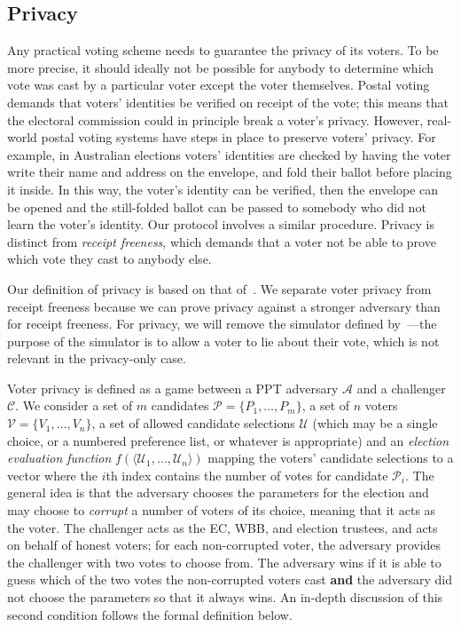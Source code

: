 \documentclass[12pt,a4paper]{article}
\theoremstyle{definition}
\begin{document}
\subsection{Privacy}
Any practical voting scheme needs to guarantee the privacy of its voters. To be more precise, it should ideally not be possible for anybody to determine which vote was cast by a particular voter except the voter themselves. Postal voting demands that voters' identities be verified on receipt of the vote; this means that the electoral commission could in principle break a voter's privacy. However, real-world postal voting systems have steps in place to preserve voters' privacy. For example, in Australian elections voters' identities are checked by having the voter write their name and address on the envelope, and fold their ballot before placing it inside. In this way, the voter's identity can be verified, then the envelope can be opened and the still-folded ballot can be passed to somebody who did not learn the voter's identity. Our protocol involves a similar procedure. Privacy is distinct from \textit{receipt freeness}, which demands that a voter not be able to prove which vote they cast to anybody else.

Our definition of privacy is based on that of~\cite{kiayias2015end}. We separate voter privacy from receipt freeness because we can prove privacy against a stronger adversary than for receipt freeness. For privacy, we will remove the simulator defined by~\cite{kiayias2015end}---the purpose of the simulator is to allow a voter to lie about their vote, which is not relevant in the privacy-only case.

Voter privacy is defined as a game between a PPT adversary $\mathcal{A}$ and a challenger $\mathcal{C}$. We consider a set of $m$ candidates $\mathcal{P}=\{P_1,\ldots,P_m\}$, a set of $n$ voters $\mathcal{V}=\{V_1,\ldots,V_n\}$, a set of allowed candidate selections $\mathcal{U}$ (which may be a single choice, or a numbered preference list, or whatever is appropriate) and an \textit{election evaluation function} $f(\langle \mathcal{U}_1,\ldots,\mathcal{U}_n \rangle)$ mapping the voters' candidate selections to a vector where the $i$th index contains the number of votes for candidate $\mathcal{P}_i$. The general idea is that the adversary chooses the parameters for the election and may choose to \textit{corrupt} a number of voters of its choice, meaning that it acts as the voter. The challenger acts as the EC, WBB, and election trustees, and acts on behalf of honest voters; for each non-corrupted voter, the adversary provides the challenger with two votes to choose from. The adversary wins if it is able to guess which of the two votes the non-corrupted voters cast \textbf{and} the adversary did not choose the parameters so that it always wins. An in-depth discussion of this second condition follows the formal definition below.
\end{document}
